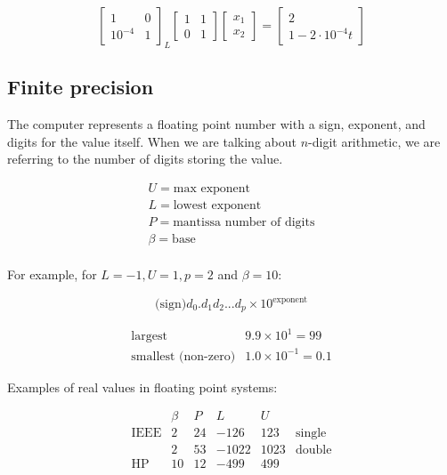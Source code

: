 \[
	\begin{bmatrix}
		1 & 0 \\ 10^{-4} & 1
	\end{bmatrix}_L
	\begin{bmatrix}
		1 & 1 \\ 0 & 1
	\end{bmatrix}
	\begin{bmatrix}
		x_1 \\ x_2
	\end{bmatrix} =
	\begin{bmatrix}
		2 \\ 1 - 2 \cdot 10^{-4}t
	\end{bmatrix}
\]

\subsection{Finite precision}

The computer represents a floating point number with a sign, exponent, and digits for the value itself. When we are talking about $n$-digit arithmetic, we are referring to the number of digits storing the value.

\[
	\begin{matrix}
		U = \text{max exponent} \\
		L = \text{lowest exponent} \\
		P = \text{mantissa number of digits} \\
		\beta = \text{base} \\
	\end{matrix}
\]

For example, for $L=-1, U=1, p=2$ and $\beta = 10$:

\[
	\text{(sign)} d_0 . d_1 d_2 ... d_p \times 10^{\text{exponent}}
\]

\[
	\begin{matrix}
		\text{largest} & 9.9 \times 10^1 = 99\\
		\text{smallest (non-zero)} & 1.0 \times 10^{-1} = 0.1
	\end{matrix}
\]

Examples of real values in floating point systems:

\[
	\begin{matrix}
		& \beta & P & L & U \\
		\text{IEEE} & 2 & 24 & -126 & 123 & \text{single} \\
					& 2 & 53 & -1022 & 1023 & \text{double}\\ 
		\text{HP}   & 10 & 12 & -499 & 499
	\end{matrix}
\]

